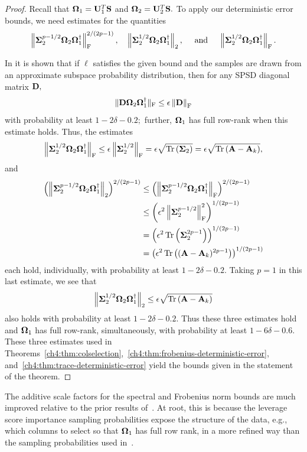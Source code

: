 \begin{proof}
Recall that $\mathbf{\Omega}_1 = \mathbf{U}_1^T
\mathbf{S}$ and $\mathbf{\Omega}_2 = \mathbf{U}_2^T \mathbf{S}.$ 
To apply our deterministic error bounds, we need estimates for the quantities
\[
 \left\|\mathbf{\Sigma}_2^{p-1/2} \mathbf{\Omega}_2 \mathbf{\Omega}_1^\dagger\right\|_\mathrm{F}^{2/(2p-1)}, \quad \left\|\mathbf{\Sigma}_2^{1/2} \mathbf{\Omega}_2 \mathbf{\Omega}_1^\dagger\right\|_2,
 \quad \text{ and } \quad \left\|\mathbf{\Sigma}_2^{1/2} \mathbf{\Omega}_2 \mathbf{\Omega}_1^\dagger\right\|_\mathrm{F}.
\]

In \cite[proof of Proposition 22]{MTJ12} it is shown that if $\ell$ satisfies 
the given bound and the samples are drawn from an approximate subspace 
probability distribution, then for any SPSD diagonal matrix $\mathbf{D},$
\[
 \|\mathbf{D} \mathbf{\Omega}_2 \mathbf{\Omega}_1^\dagger\|_{\mathrm{F}} \leq \epsilon \left\|\mathbf{D}\right\|_\mathrm{F}
\]
with probability at least $1-2\delta-0.2;$ further,
$\mathbf{\Omega}_1$ has full row-rank when this estimate holds. Thus, the estimates
\[
 \left\|\mathbf{\Sigma}_2^{1/2} \mathbf{\Omega}_2 \mathbf{\Omega}_1^\dagger\right\|_\mathrm{F} \leq 
 \epsilon \left\|\mathbf{\Sigma}_2^{1/2}\right\|_\mathrm{F} = \epsilon \sqrt{\operatorname{Tr}\left(\mathbf{\Sigma}_2\right)}
 = \epsilon \sqrt{\operatorname{Tr}\left(\mathbf{A} - \mathbf{A}_k\right)},
\]
and 
\begin{align*}
 \left( \left\|\mathbf{\Sigma}_2^{p-1/2} \mathbf{\Omega}_2 \mathbf{\Omega}_1^\dagger\right\|_2 
  \right)^{2/(2p-1)} & \leq 
  \left( \left\|\mathbf{\Sigma}_2^{p-1/2} \mathbf{\Omega}_2 \mathbf{\Omega}_1^\dagger\right\|_\mathrm{F}  
  \right)^{2/(2p-1)} \\
  & \leq \left( \epsilon^2 \left\|\mathbf{\Sigma}_2^{p-1/2}\right\|_\mathrm{F}^2 \right)^{1/(2p-1)} \\
  & = \left(\epsilon^2 \operatorname{Tr}\left(\mathbf{\Sigma}_2^{2p-1}\right)\right)^{1/(2p-1)} \\
  & = \left(\epsilon^2 \operatorname{Tr}\left((\mathbf{A} - \mathbf{A}_k)^{2p-1}\right)\right)^{1/(2p-1)}
\end{align*}
each hold, individually, with probability at least $1-2\delta-0.2.$ Taking 
$p=1$ in this last estimate, we see that
\[
  \left\|\mathbf{\Sigma}_2^{1/2} \mathbf{\Omega}_2 \mathbf{\Omega}_1^\dagger\right\|_2 \leq 
   \epsilon \sqrt{\operatorname{Tr}\left(\mathbf{A} - \mathbf{A}_k\right)}
\]
also holds with probability at least $1 - 2\delta - 0.2.$ Thus these three estimates
hold and $\mathbf{\Omega}_1$ has full row-rank, simultaneously, with probability at least $1 - 6\delta - 0.6.$
These three estimates used in 
Theorems~\ref{ch4:thm:colselection},~\ref{ch4:thm:frobenius-deterministic-error},
and~\ref{ch4:thm:trace-deterministic-error} yield the bounds given in the 
statement of the theorem.
\end{proof}

\noindent
\begin{remark}
The additive scale factors for the spectral and Frobenius norm bounds are 
much improved relative to the prior results of~\cite{DM05}.
At root, this is because the leverage score importance sampling probabilities 
expose the structure of the data, e.g., which columns to select so 
that $\mathbf{\Omega}_1$ has full row rank,
in a more refined way than the 
sampling probabilities used in~\cite{DM05}.
\end{remark}

